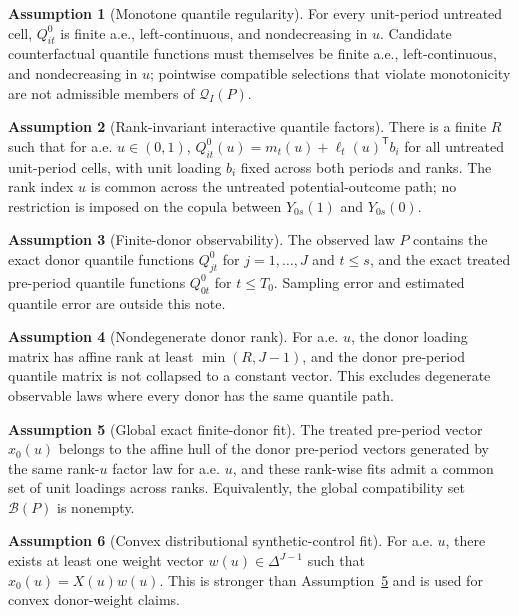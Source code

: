 \documentclass[11pt]{article}
\newcommand{\transpose}{\mathsf{T}}
\theoremstyle{definition}
\newtheorem{assumption}{Assumption}
\theoremstyle{plain}
\theoremstyle{remark}
\begin{document}
\begin{assumption}[Monotone quantile regularity]\label{ass:monotone}
For every unit-period untreated cell, \(Q^0_{it}\) is finite a.e., left-continuous, and nondecreasing in \(u\).  Candidate counterfactual quantile functions must themselves be finite a.e., left-continuous, and nondecreasing in \(u\); pointwise compatible selections that violate monotonicity are not admissible members of \(\mathcal{Q}_I(P)\).
\end{assumption}

\begin{assumption}[Rank-invariant interactive quantile factors]\label{ass:qif}
There is a finite \(R\) such that for a.e. \(u\in(0,1)\), \(Q^0_{it}(u)=m_t(u)+\ell_t(u)^\transpose b_i\) for all untreated unit-period cells, with unit loading \(b_i\) fixed across both periods and ranks.  The rank index \(u\) is common across the untreated potential-outcome path; no restriction is imposed on the copula between \(Y_{0s}(1)\) and \(Y_{0s}(0)\).
\end{assumption}

\begin{assumption}[Finite-donor observability]\label{ass:finiteobs}
The observed law \(P\) contains the exact donor quantile functions \(Q^0_{jt}\) for \(j=1,\ldots,J\) and \(t\le s\), and the exact treated pre-period quantile functions \(Q^0_{0t}\) for \(t\le T_0\).  Sampling error and estimated quantile error are outside this note.
\end{assumption}

\begin{assumption}[Nondegenerate donor rank]\label{ass:rank}
For a.e. \(u\), the donor loading matrix has affine rank at least \(\min(R,J-1)\), and the donor pre-period quantile matrix is not collapsed to a constant vector.  This excludes degenerate observable laws where every donor has the same quantile path.
\end{assumption}

\begin{assumption}[Global exact finite-donor fit]\label{ass:exactfit}
The treated pre-period vector \(x_0(u)\) belongs to the affine hull of the donor pre-period vectors generated by the same rank-\(u\) factor law for a.e. \(u\), and these rank-wise fits admit a common set of unit loadings across ranks.  Equivalently, the global compatibility set \(\mathcal{B}(P)\) is nonempty.
\end{assumption}

\begin{assumption}[Convex distributional synthetic-control fit]\label{ass:convexfit}
For a.e. \(u\), there exists at least one weight vector \(w(u)\in\Delta^{J-1}\) such that \(x_0(u)=X(u)w(u)\).  This is stronger than Assumption~\ref{ass:exactfit} and is used for convex donor-weight claims.
\end{assumption}
\end{document}
